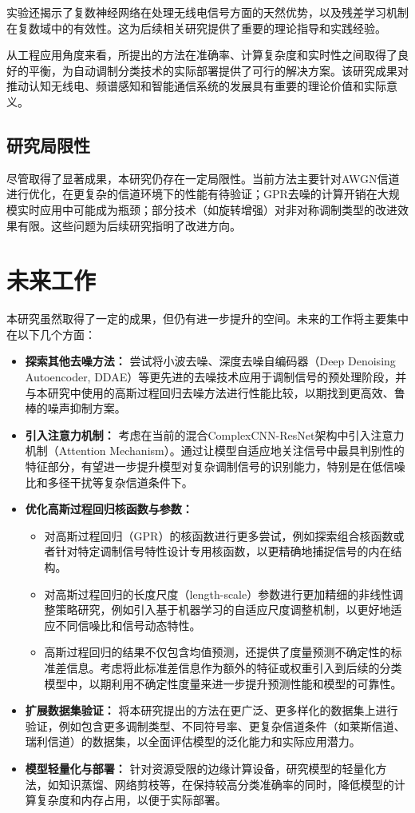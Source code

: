 \documentclass[conference]{IEEEtran}
\begin{document}
实验还揭示了复数神经网络在处理无线电信号方面的天然优势，以及残差学习机制在复数域中的有效性。这为后续相关研究提供了重要的理论指导和实践经验。

从工程应用角度来看，所提出的方法在准确率、计算复杂度和实时性之间取得了良好的平衡，为自动调制分类技术的实际部署提供了可行的解决方案。该研究成果对推动认知无线电、频谱感知和智能通信系统的发展具有重要的理论价值和实际意义。

\subsection{研究局限性}

尽管取得了显著成果，本研究仍存在一定局限性。当前方法主要针对AWGN信道进行优化，在更复杂的信道环境下的性能有待验证；GPR去噪的计算开销在大规模实时应用中可能成为瓶颈；部分技术（如旋转增强）对非对称调制类型的改进效果有限。这些问题为后续研究指明了改进方向。

\section{未来工作}
本研究虽然取得了一定的成果，但仍有进一步提升的空间。未来的工作将主要集中在以下几个方面：

\begin{itemize}
    \item \textbf{探索其他去噪方法：} 尝试将小波去噪、深度去噪自编码器（Deep Denoising Autoencoder, DDAE）等更先进的去噪技术应用于调制信号的预处理阶段，并与本研究中使用的高斯过程回归去噪方法进行性能比较，以期找到更高效、鲁棒的噪声抑制方案。
    \item \textbf{引入注意力机制：} 考虑在当前的混合ComplexCNN-ResNet架构中引入注意力机制（Attention Mechanism）。通过让模型自适应地关注信号中最具判别性的特征部分，有望进一步提升模型对复杂调制信号的识别能力，特别是在低信噪比和多径干扰等复杂信道条件下。
    \item \textbf{优化高斯过程回归核函数与参数：}
    \begin{itemize}
        \item 对高斯过程回归（GPR）的核函数进行更多尝试，例如探索组合核函数或者针对特定调制信号特性设计专用核函数，以更精确地捕捉信号的内在结构。
        \item 对高斯过程回归的长度尺度（length-scale）参数进行更加精细的非线性调整策略研究，例如引入基于机器学习的自适应尺度调整机制，以更好地适应不同信噪比和信号动态特性。
        \item 高斯过程回归的结果不仅包含均值预测，还提供了度量预测不确定性的标准差信息。考虑将此标准差信息作为额外的特征或权重引入到后续的分类模型中，以期利用不确定性度量来进一步提升预测性能和模型的可靠性。
    \end{itemize}
    \item \textbf{扩展数据集验证：} 将本研究提出的方法在更广泛、更多样化的数据集上进行验证，例如包含更多调制类型、不同符号率、更复杂信道条件（如莱斯信道、瑞利信道）的数据集，以全面评估模型的泛化能力和实际应用潜力。
    \item \textbf{模型轻量化与部署：} 针对资源受限的边缘计算设备，研究模型的轻量化方法，如知识蒸馏、网络剪枝等，在保持较高分类准确率的同时，降低模型的计算复杂度和内存占用，以便于实际部署。
\end{itemize}
\end{document}
